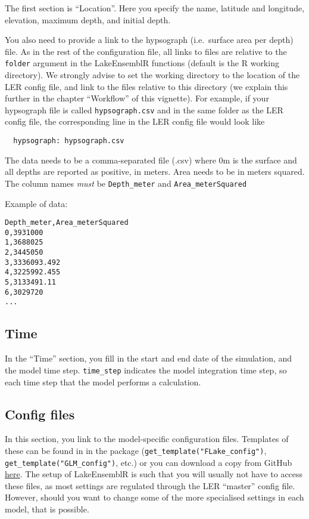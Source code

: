 \documentclass[
]{article}
\begin{document}
The first section is ``Location''. Here you specify the name, latitude
and longitude, elevation, maximum depth, and initial depth.

You also need to provide a link to the hypsograph (i.e.~surface area per
depth) file. As in the rest of the configuration file, all links to
files are relative to the \texttt{folder} argument in the LakeEnsemblR
functions (default is the R working directory). We strongly advise to
set the working directory to the location of the LER config file, and
link to the files relative to this directory (we explain this further in
the chapter ``Workflow'' of this vignette). For example, if your
hypsograph file is called \texttt{hypsograph.csv} and in the same folder
as the LER config file, the corresponding line in the LER config file
would look like

\begin{verbatim}
  hypsograph: hypsograph.csv
\end{verbatim}

The data needs to be a comma-separated file (.csv) where 0m is the
surface and all depths are reported as positive, in meters. Area needs
to be in meters squared. The column names \emph{must} be
\texttt{Depth\_meter} and \texttt{Area\_meterSquared}

Example of data:

\begin{verbatim}
Depth_meter,Area_meterSquared
0,3931000
1,3688025
2,3445050
3,3336093.492
4,3225992.455
5,3133491.11
6,3029720
...
\end{verbatim}

\hypertarget{time}{%
\subsection{Time}\label{time}}

In the ``Time'' section, you fill in the start and end date of the
simulation, and the model time step. \texttt{time\_step} indicates the
model integration time step, so each time step that the model performs a
calculation.

\hypertarget{config-files}{%
\subsection{Config files}\label{config-files}}

In this section, you link to the model-specific configuration files.
Templates of these can be found in in the package
(\texttt{get\_template("FLake\_config")},
\texttt{get\_template("GLM\_config")}, etc.) or you can download a copy
from GitHub
\href{https://github.com/aemon-j/LakeEnsemblR/blob/master/inst/extdata}{here}.
The setup of LakeEnsemblR is such that you will usually not have to
access these files, as most settings are regulated through the LER
``master'' config file. However, should you want to change some of the
more specialised settings in each model, that is possible.
\end{document}
